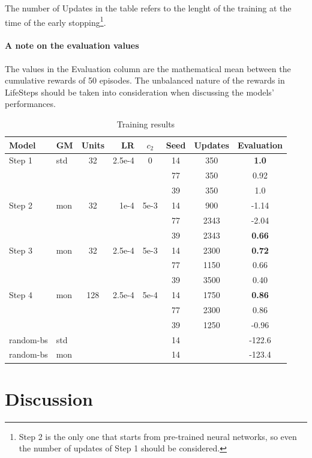 \documentclass{article}
\begin{document}
The number of Updates in the table refers to the lenght of the training at the time of the early stopping\footnote{Step 2 is the only one that starts from pre-trained neural networks, so even the number of updates of Step 1 should be considered.}.

\paragraph{A note on the evaluation values}
The values in the Evaluation column are the mathematical mean between the cumulative rewards of 50 episodes. The unbalanced nature of the rewards in LifeSteps should be taken into consideration when discussing the models' performances. 

\begin{table}
  \caption{Training results}
  \label{results}
  \centering
  \begin{tabular}{llcrcccc}
    \toprule
    Model & GM & Units & LR & \(c_2\) & Seed & Updates & Evaluation\\
    \midrule
    Step 1  & std & 32  & 2.5e-4  & 0 & 14 & 350 & \textbf{1.0} \\
    & & & & & 77 & 350 & 0.92 \\
    & & & & & 39 & 350 & 1.0 \\
    \midrule
    Step 2  & mon & 32  & 1e-4   & 5e-3 & 14 & 900 & -1.14\\
    & & & & & 77 & 2343 & -2.04 \\
    & & & & & 39 & 2343 & \textbf{0.66} \\
    \midrule
    Step 3  & mon & 32  & 2.5e-4  & 5e-3 & 14 & 2300 & \textbf{0.72}\\
    & & & & & 77 & 1150 & 0.66 \\
    & & & & & 39 & 3500 & 0.40 \\
    \midrule
    Step 4  & mon & 128 & 2.5e-4  & 5e-4 & 14 & 1750 & \textbf{0.86}\\
    & & & & & 77 & 2300 & 0.86 \\
    & & & & & 39 & 1250 & -0.96 \\
    \midrule
    random-bs  
            & std & & & & 14 & & -122.6 \\
    random-bs
            & mon & & & & 14 & & -123.4 \\
    
    \bottomrule
  \end{tabular}
\end{table}

\section{Discussion}
\end{document}
